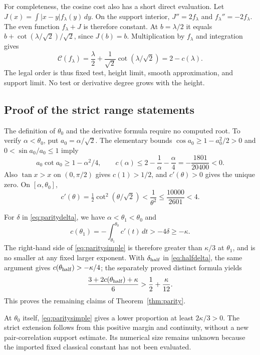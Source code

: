 ﻿\documentclass[11pt]{article}
\theoremstyle{remark}
\newcommand{\cC}{\mathcal C}
\begin{document}
For completeness, the cosine cost also has a short direct evaluation.
Let $J(x)=\int|x-y|f_\lambda(y)\,dy$. On the support interior,
$J''=2f_\lambda$ and $f_\lambda''=-2f_\lambda$. The even function
$f_\lambda+J$ is therefore constant. At $b=\lambda/2$ it equals
$b+\cot(\lambda/\sqrt2)/\sqrt2$, since $J(b)=b$. Multiplication by
$f_\lambda$ and integration gives
\[
 \cC(f_\lambda)=\frac\lambda2+
               \frac1{\sqrt2}\cot(\lambda/\sqrt2)=2-c(\lambda).
\]
The legal order is thus fixed test, height limit, smooth approximation,
and support limit. No test or derivative degree grows with the height.

\subsection{Proof of the strict range statements}

The definition of $\theta_0$ and the derivative formula require no
computed root. To verify $\alpha<\theta_0$, put $a_0=\alpha/\sqrt2$.
The elementary bounds $\cos a_0\ge1-a_0^2/2>0$ and
$0<\sin a_0/a_0\le1$ imply
\[
 a_0\cot a_0\ge1-\alpha^2/4,
 \qquad c(\alpha)\le2-\frac1\alpha-\frac\alpha4
                  =-\frac{1801}{20400}<0.
\]
Also $\tan x>x$ on $(0,\pi/2)$ gives $c(1)>1/2$, and
$c'(\theta)>0$ gives the unique zero. On $[\alpha,\theta_0]$,
\begin{equation}\label{eq:derivativecap}
 c'(\theta)=\tfrac12\cot^2(\theta/\sqrt2)
     <\frac1{\theta^2}\le\frac{10000}{2601}<4.
\end{equation}

For $\delta$ in \eqref{eq:paritydelta}, we have
$\alpha<\theta_1<\theta_0$ and
\[
 c(\theta_1)=-\int_{\theta_1}^{\theta_0}c'(t)\,dt
             >-4\delta\ge-\kappa.
\]
The right-hand side of \eqref{eq:paritysimple} is therefore greater
than $\kappa/3$ at $\theta_1$, and is no smaller at any fixed larger
exponent. With $\delta_{\rm half}$ in \eqref{eq:halfdelta}, the same
argument gives $c(\theta_{\rm half})>-\kappa/4$; the separately proved
distinct formula yields
\[
 \frac{3+2c(\theta_{\rm half})+\kappa}{6}
      >\frac12+\frac\kappa{12}.
\]
This proves the remaining claims of Theorem~\ref{thm:parity}.

At $\theta_0$ itself, \eqref{eq:paritysimple} gives a lower proportion
at least $2\kappa/3>0$. The strict extension follows from this positive
margin and continuity, without a new pair-correlation support estimate.
Its numerical size remains unknown because the imported fixed classical
constant has not been evaluated.
\end{document}
